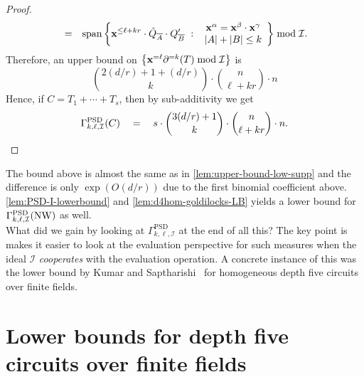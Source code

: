 \begin{proof}
\begin{eqnarray*}
& = & \mathrm{span}\left\{{ \mathbf{x}^{\leq \ell + kr} \cdot \tilde{Q}_{\overline{A}} \cdot Q_{\overline{B}}'}\ : \ {\begin{array}{c} \mathbf{x}^{\alpha} = \mathbf{x}^\beta \cdot \mathbf{x}^\gamma\\ |A| + |B| \leq k  \end{array}}\right\} \bmod \mathcal{I}.
\end{eqnarray*}
\noindent
Therefore, an upper bound on $\left\{\mathbf{x}^{=\ell} \partial^{=k}(T) \bmod \mathcal{I}\right\}$ is 
\[
\binom{2(d/r) + 1 + (d/r)}{k} \cdot \binom{n}{\ell + kr} \cdot n
\]
\noindent
Hence, if $C = T_1 + \cdots + T_s$, then by sub-additivity we get
\[
\Gamma^{\mathrm{PSD}}_{k,\ell,\mathcal{I}}(C) \quad = \quad s \cdot \binom{3(d/r) + 1}{k} \cdot \binom{n}{\ell + kr} \cdot n.\qedhere
\]
\end{proof}

\noindent
The bound above is almost the same as in \autoref{lem:upper-bound-low-supp} and the difference is only $\exp(O(d/r))$ due to the first binomial coefficient above. \autoref{lem:PSD-I-lowerbound} and 
\autoref{lem:d4hom-goldilocks-LB} yields a lower bound for $\Gamma^{\mathrm{PSD}}_{k,\ell,\mathcal{I}}(\operatorname{\mathrm{NW}})$ as well. \\

What did we gain by looking at $\Gamma^{\mathrm{PSD}}_{k,\ell,\mathcal{I}}$ at the end of all this?
The key point is makes it easier to look at the evaluation perspective for such measures when the ideal $\mathcal{I}$ \emph{cooperates} with the evaluation operation.
A concrete instance of this was the lower bound by Kumar and Saptharishi~\cite{KumarSapt15} for homogeneous depth five circuits over finite fields.

\section{Lower bounds for depth five circuits over finite fields}








